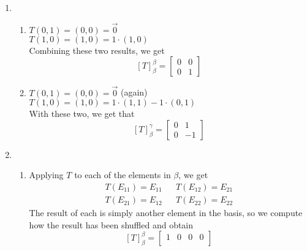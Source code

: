 \documentclass[12pt]{article}
\begin{document}
\begin{enumerate}
\begin{enumerate}
                  \item \begin{enumerate}
                              \item $T(0,1)=(0,0)=\vec{0}$ \\
                                    $T(1,0)=(1,0)=1 \cdot (1, 0)$ \\
                                    Combining these two results, we get
                                    \[[T]^\beta_\beta=\begin{bmatrix}
                                                0 & 0 \\
                                                0 & 1
                                          \end{bmatrix}\]
                              \item $T(0,1)=(0,0)=\vec{0}$ (again) \\
                                    $T(1,0)=(1,0)=1 \cdot (1, 1) - 1 \cdot (0, 1)$ \\
                                    With these two, we get that
                                    \[[T]^\gamma_\beta=\begin{bmatrix}
                                                0 & 1  \\
                                                0 & -1
                                          \end{bmatrix}\]
                        \end{enumerate}
                  \item \begin{enumerate}
                              \item Applying $T$ to each of the elements in $\beta$, we get
                                    \begin{align*}
                                          T(E_{11})=E_{11} &  & T(E_{12})=E_{21} \\
                                          T(E_{21})=E_{12} &  & T(E_{22})=E_{22}
                                    \end{align*}
                                    The result of each is simply another element in the basis, so
                                    we compute how the result has been shuffled and obtain
                                    \[[T]^\beta_\beta=\begin{bmatrix}
                                                1 & 0 & 0 & 0 \\

\end{bmatrix}\]
\end{enumerate}
\end{enumerate}
\end{enumerate}
\end{document}
